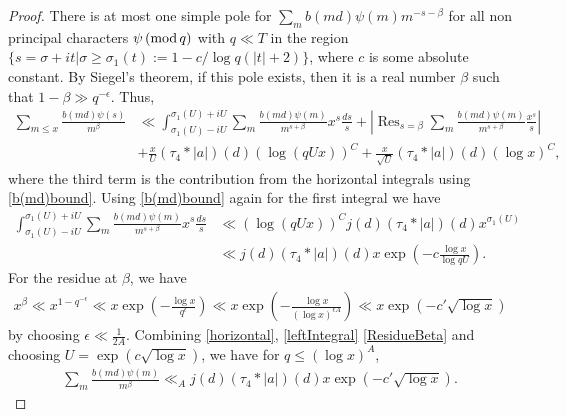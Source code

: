 \documentclass[oneside, 12pt]{amsart}
\theoremstyle{definition}
\renewcommand{\pmod}[1]{\,(\textup{mod}\,#1)}
\begin{document}
\begin{proof}
There is at most one simple pole for $\sum_{m}b(md)\psi(m)m^{-s-\beta}$ for all non principal characters $\psi\pmod q$ with $q\ll T$ in the region $\{s=\sigma+it| \sigma\geq \sigma_1(t):= 1-c/\log q (|t|+2) \}$, where $c$ is some absolute constant. By Siegel's theorem, if this pole exists, then it is a real number $\beta$ such that $1-\beta \gg q^{-\epsilon}$. Thus,
\begin{align}
\sum_{m\leq x}\frac{b(md)\psi(s)}{m^\beta}&\ll \int_{\sigma_1(U)-iU}^{\sigma_1(U)+iU}\sum_{m} \frac{b(md)\psi(m)}{m^{s+\beta}}x^s\frac{ds}{s}+\left| \operatorname{Res}_{s=\beta}\sum_{m}\frac{b(md)\psi(m)}{m^{s+\beta}}\frac{x^s}{s}\right|\nonumber
\\
&+\frac{x}{{U}}(\tau_4*|a|)(d)(\log (qUx))^C +\frac{x}{\sqrt{U}}(\tau_4*|a|)(d)(\log x)^C,\label{horizontal}
\end{align}
where the third term is the contribution from the horizontal integrals using \eqref{b(md)bound}. 
Using \eqref{b(md)bound} again for the first integral we have
\begin{align}\label{leftIntegral}
\int_{\sigma_1(U)-iU}^{\sigma_1(U)+iU}\sum_{m}\frac{b(md)\psi(m)}{m^{s+\beta}}x^s \frac{ds}{s}
&\ll (\log (q U x))^C j(d)(\tau_4* |a|)(d) x^{\sigma_1(U)}\nonumber\\
&\ll j(d)(\tau_4*|a|)(d) x \exp (-c \frac{\log x}{\log q U}).
\end{align}
For the residue at $\beta$, we have 
\begin{align}\label{ResidueBeta}
x^\beta \ll x^{1-q^{-\epsilon}} \ll x \exp (-\frac{\log x}{q^\epsilon})\ll x\exp (- \frac{\log x}{(\log x)^{\epsilon A}})\ll x\exp (-c' \sqrt{\log x})
\end{align}
by choosing $\epsilon\ll \frac{1}{2A}$. 
Combining \eqref{horizontal}, \eqref{leftIntegral} \eqref{ResidueBeta} and choosing $U=\exp (c\sqrt{\log x})$, we have for $q\leq (\log x)^A$,
\begin{align}
\sum_{m} \frac{b(md)\psi(m)}{m^{\beta}}\ll_A j(d)(\tau_4*|a|)(d) x \exp(-c'\sqrt{\log x}).
\end{align} 
\end{proof}
\end{document}
